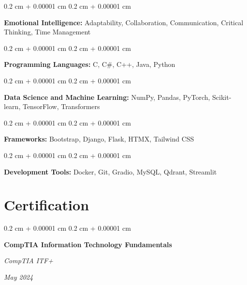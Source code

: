 \documentclass[10pt, letterpaper]{article}
\newenvironment{onecolentry}{
    \begin{adjustwidth}{
        0.2 cm + 0.00001 cm
    }{
        0.2 cm + 0.00001 cm
    }
}{
    \end{adjustwidth}
} %
\newenvironment{twocolentry}[2][]{
    \onecolentry
    \def\secondColumn{#2}
    \setcolumnwidth{\fill, 4.5 cm}
    \begin{paracol}{2}
}{
    \switchcolumn \raggedleft \secondColumn
    \end{paracol}
    \endonecolentry
} %
\begin{document}
        
        \begin{onecolentry}
            \textbf{Emotional Intelligence:} Adaptability, Collaboration, Communication, Critical Thinking, Time Management
        \end{onecolentry}

        \vspace{0.2 cm}

        \begin{onecolentry}
            \textbf{Programming Languages:} C, C\#, C++, Java, Python
        \end{onecolentry}

        \vspace{0.2 cm}

        \begin{onecolentry}
            \textbf{Data Science and Machine Learning:} NumPy, Pandas, PyTorch, Scikit-learn, TensorFlow, Transformers
        \end{onecolentry}

        \vspace{0.2 cm}

        \begin{onecolentry}
            \textbf{Frameworks:} Bootstrap, Django, Flask, HTMX, Tailwind CSS
        \end{onecolentry}

        \vspace{0.2 cm}

        \begin{onecolentry}
            \textbf{Development Tools:} Docker, Git, Gradio, MySQL, Qdrant, Streamlit
        \end{onecolentry}


    
    \section{Certification}



        
        \begin{twocolentry}{
            
            
        \textit{May 2024}}
            \textbf{CompTIA Information Technology Fundamentals}
            
            \textit{CompTIA ITF+}
        \end{twocolentry}
\end{document}
